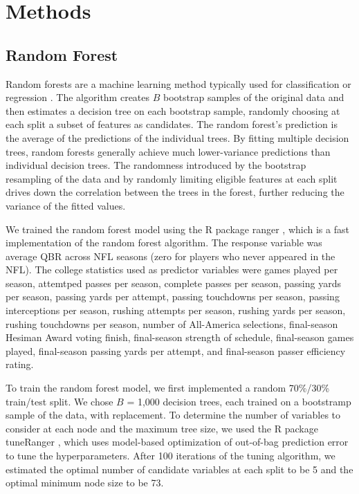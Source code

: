 \documentclass[Review, sageh, times]{sagej}
\begin{document}
\section{Methods}
\label{sec:methods}

\subsection{Random Forest}

Random forests are a machine learning method typically used for classification or regression \citep{breiman_random_2001}. The algorithm creates $B$ bootstrap samples of the original data and then estimates a decision tree on each bootstrap sample, randomly choosing at each split a subset of features as candidates. The random forest's prediction is the average of the predictions of the individual trees. By fitting multiple decision trees, random forests generally achieve much lower-variance predictions than individual decision trees. The randomness introduced by the bootstrap resampling of the data and by randomly limiting eligible features at each split drives down the correlation between the trees in the forest, further reducing the variance of the fitted values.

We trained the random forest model using the R package ranger \citep{wright_ranger_2024}, which is a fast implementation of the random forest algorithm. The response variable was average QBR across NFL seasons (zero for players who never appeared in the NFL). The college statistics used as predictor variables were games played per season, attemtped passes per season, complete passes per season, passing yards per season, passing yards per attempt, passing touchdowns per season, passing interceptions per season, rushing attempts per season, rushing yards per season, rushing touchdowns per season, number of All-America selections, final-season Hesiman Award voting finish, final-season strength of schedule, final-season games played, final-season passing yards per attempt, and final-season passer efficiency rating.

To train the random forest model, we first implemented a random 70\%/30\% train/test split. We chose $B$ = 1,000 decision trees, each trained on a bootstramp sample of the data, with replacement. To determine the number of variables to consider at each node and the maximum tree size, we used the R package tuneRanger \citep{probst_tuneranger_2024}, which uses model-based optimization of out-of-bag prediction error to tune the hyperparameters. After 100 iterations of the tuning algorithm, we estimated the optimal number of candidate variables at each split to be 5 and the optimal minimum node size to be 73.
\end{document}
